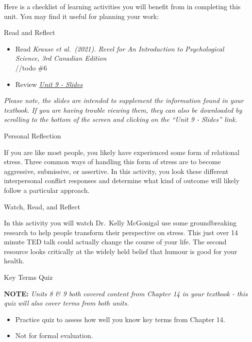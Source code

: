 \documentclass[
]{book}
\providecommand{\tightlist}{%
  \setlength{\itemsep}{0pt}\setlength{\parskip}{0pt}}
\begin{document}
\begin{reflect}
Here is a checklist of learning activities you will benefit from in completing this unit. You may find it useful for planning your work:

{Read and Reflect}

\begin{itemize}
\tightlist
\item
  Read \emph{Krause et al.~(2021). Revel for An Introduction to Psychological Science, 3rd Canadian Edition}\\
  //todo \#6
\item
  Review \href{PSYC106-CH14HealthStressandCoping3rdEd.pptx}{\emph{Unit 9 - Slides}}
\end{itemize}

\emph{Please note, the slides are intended to supplement the information found in your textbook. If you are having trouble viewing them, they can also be downloaded by scrolling to the bottom of the screen and clicking on the ``Unit 9 - Slides'' link.}

{Personal Reflection}

If you are like most people, you likely have experienced some form of relational stress. Three common ways of handling this form of stress are to become aggressive, submissive, or assertive. In this activity, you look these different interpersonal conflict responses and determine what kind of outcome will likely follow a particular approach.

{Watch, Read, and Reflect}

In this activity you will watch Dr.~Kelly McGonigal use some groundbreaking research to help people transform their perspective on stress. This just over 14 minute TED talk could actually change the course of your life. The second resource looks critically at the widely held belief that humour is good for your health.

{Key Terms Quiz}

\textbf{NOTE:} \emph{Units 8 \& 9 both covered content from Chapter 14 in your textbook - this quiz will also cover terms from both units.}

\begin{itemize}
\tightlist
\item
  Practice quiz to assess how well you know key terms from Chapter 14.\\
\item
  Not for formal evaluation.
\end{itemize}


\end{reflect}
\end{document}
